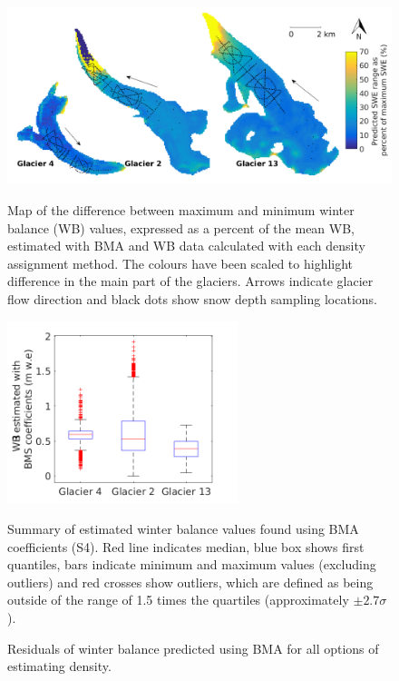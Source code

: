 \documentclass{sfuthesis}
\newcommand{\boxMatlab}{Red line indicates median, blue box shows first quantiles, bars indicate minimum and maximum values (excluding outliers) and red crosses show outliers, which are defined as being outside of the range of 1.5 times the quartiles (approximately $\pm2.7\sigma$). }
\newcommand{\topomap}{Arrows indicate glacier flow direction and black dots show snow depth sampling locations. }
\begin{document}
 \begin{figure}[H]
	\centering
	\includegraphics[width =\textwidth]{BMS_SWEdifferenceMap_percent.png}\\
	\caption{Map of the difference between maximum and minimum winter balance (WB) values, expressed as a percent of the mean WB, estimated with BMA and WB data calculated with each density assignment method. The colours have been scaled to highlight difference in the main part of the glaciers. \topomap}
	\label{fig:BMS_SWEdiffMap_precent}
\end{figure} 

\begin{figure}[H]
\centering
	\includegraphics[width =0.6\textwidth]{ModelledSWE_box_BMS.png}\\
\caption{Summary of estimated winter balance values found using BMA coefficients (S4). \boxMatlab}
\label{fig:BMAsweboxplot}
\end{figure} 

\begin{figure}[H]
	\caption{Residuals of winter balance predicted using BMA for all options of estimating density.}
	\label{fig:BMSresiduals_all}
\end{figure}
\end{document}
